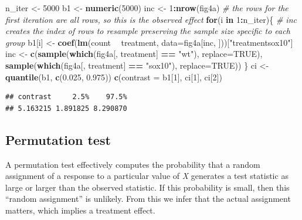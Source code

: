 \documentclass[]{book}
\newenvironment{Shaded}{\begin{snugshade}}{\end{snugshade}}
\newcommand{\KeywordTok}[1]{\textcolor[rgb]{0.13,0.29,0.53}{\textbf{#1}}}
\newcommand{\DataTypeTok}[1]{\textcolor[rgb]{0.13,0.29,0.53}{#1}}
\newcommand{\DecValTok}[1]{\textcolor[rgb]{0.00,0.00,0.81}{#1}}
\newcommand{\FloatTok}[1]{\textcolor[rgb]{0.00,0.00,0.81}{#1}}
\newcommand{\StringTok}[1]{\textcolor[rgb]{0.31,0.60,0.02}{#1}}
\newcommand{\CommentTok}[1]{\textcolor[rgb]{0.56,0.35,0.01}{\textit{#1}}}
\newcommand{\OtherTok}[1]{\textcolor[rgb]{0.56,0.35,0.01}{#1}}
\newcommand{\ControlFlowTok}[1]{\textcolor[rgb]{0.13,0.29,0.53}{\textbf{#1}}}
\newcommand{\OperatorTok}[1]{\textcolor[rgb]{0.81,0.36,0.00}{\textbf{#1}}}
\newcommand{\NormalTok}[1]{#1}
\begin{document}
\begin{Shaded}
\begin{Highlighting}[]
\NormalTok{n_iter <-}\StringTok{ }\DecValTok{5000}
\NormalTok{b1 <-}\StringTok{ }\KeywordTok{numeric}\NormalTok{(}\DecValTok{5000}\NormalTok{)}
\NormalTok{inc <-}\StringTok{ }\DecValTok{1}\OperatorTok{:}\KeywordTok{nrow}\NormalTok{(fig4a) }\CommentTok{# the rows for the first iteration are all rows, so this is the observed effect}
\ControlFlowTok{for}\NormalTok{(i }\ControlFlowTok{in} \DecValTok{1}\OperatorTok{:}\NormalTok{n_iter)\{}
  \CommentTok{# inc creates the index of rows to resample preserving the sample size specific to each group}
\NormalTok{  b1[i] <-}\StringTok{ }\KeywordTok{coef}\NormalTok{(}\KeywordTok{lm}\NormalTok{(count }\OperatorTok{~}\StringTok{ }\NormalTok{treatment, }\DataTypeTok{data=}\NormalTok{fig4a[inc, ]))[}\StringTok{"treatmentsox10"}\NormalTok{]}
\NormalTok{  inc <-}\StringTok{ }\KeywordTok{c}\NormalTok{(}\KeywordTok{sample}\NormalTok{(}\KeywordTok{which}\NormalTok{(fig4a[, treatment] }\OperatorTok{==}\StringTok{ "wt"}\NormalTok{), }\DataTypeTok{replace=}\OtherTok{TRUE}\NormalTok{),}
           \KeywordTok{sample}\NormalTok{(}\KeywordTok{which}\NormalTok{(fig4a[, treatment] }\OperatorTok{==}\StringTok{ "sox10"}\NormalTok{), }\DataTypeTok{replace=}\OtherTok{TRUE}\NormalTok{))}
\NormalTok{\}}
\NormalTok{ci <-}\StringTok{ }\KeywordTok{quantile}\NormalTok{(b1, }\KeywordTok{c}\NormalTok{(}\FloatTok{0.025}\NormalTok{, }\FloatTok{0.975}\NormalTok{))}
\KeywordTok{c}\NormalTok{(}\DataTypeTok{contrast =}\NormalTok{ b1[}\DecValTok{1}\NormalTok{], ci[}\DecValTok{1}\NormalTok{], ci[}\DecValTok{2}\NormalTok{])}
\end{Highlighting}
\end{Shaded}

\begin{verbatim}
## contrast     2.5%    97.5% 
## 5.163215 1.891825 8.290870
\end{verbatim}

\subsection{Permutation test}\label{permutation-test}

A permutation test effectively computes the probability that a random
assignment of a response to a particular value of \emph{X} generates a
test statistic as large or larger than the observed statistic. If this
probability is small, then this ``random assignment'' is unlikely. From
this we infer that the actual assignment matters, which implies a
treatment effect.
\end{document}
